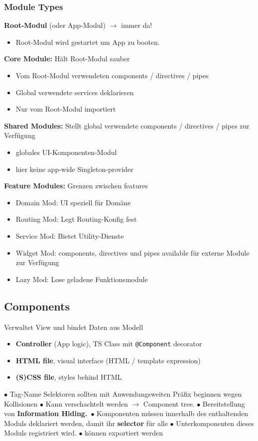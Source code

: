 \subsubsection{Module Types}
\textbf{Root-Modul} (oder App-Modul) $\rightarrow$ immer da!
\begin{itemize}
    \item Root-Modul wird gestartet um App zu booten.
\end{itemize}
\textbf{Core Module:} Hält Root-Modul sauber
\begin{itemize}
    \item Vom Root-Modul verwendeten components / directives / pipes
    \item Global verwendete services deklarieren
    \item Nur vom Root-Modul importiert
\end{itemize}
\textbf{Shared Modules:} Stellt global verwendete components / directives / pipes zur Verfügung
\begin{itemize}
    \item globales UI-Komponenten-Modul
    \item hier keine app-wide Singleton-provider
\end{itemize}
\textbf{Feature Modules:} Grenzen zwischen features
\begin{itemize}
    \item Domain Mod: UI speziell für Domäne
    \item Routing Mod: Legt Routing-Konfig fest
    \item Service Mod: Bietet Utility-Dienste
    \item Widget Mod: components, directives und pipes available für externe Module zur Verfügung
    \item Lazy Mod: Lose geladene Funktionsmodule
\end{itemize}

\subsection{Components}
Verwaltet View und bindet Daten aus Modell
\begin{itemize}
    \item \textbf{Controller} (App logic), TS Class mit \texttt{\tiny @Component} decorator
    \item \textbf{HTML file}, visual interface (HTML / template expression)
    \item \textbf{(S)CSS file}, styles behind HTML
\end{itemize}
$\bullet$ Tag-Name Selektoren sollten mit Anwendungsweiten Präfix beginnen wegen Kollisionen
$\bullet$ Kann verschachtelt werden $\rightarrow$ Component tree.
$\bullet$ Bereitstellung von \textbf{Information Hiding.}\
$\bullet$ Komponenten müssen innerhalb des enthaltenden Moduls deklariert werden, damit ihr \textbf{selector} für alle $\bullet$ Unterkomponenten dieses Moduls registriert wird.
$\bullet$ können exportiert werden

